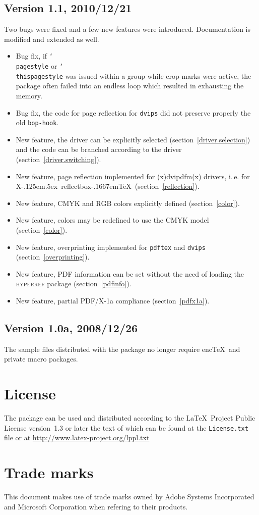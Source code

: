 \documentclass[11pt]{article}
\makeatletter
\let\pkg\textsc
\DeclareRobustCommand\cmd[1]{\texttt{\char`\\#1}}
\def\ie.{i.\,e.\@}
\DeclareRobustCommand\XeTeX{X\kern-.125em\lower.5ex\hbox{\csname
              reflectbox\endcsname{E}}\kern-.1667em\TeX}
\let\zwcomma\,
\def\,{\texorpdfstring{\zwcomma}{}}
\makeatother
\begin{document}
\subsection{Version 1.1, 2010/12/21}
Two bugs were fixed and a few new features were introduced. Documentation is modified and extended as
well.
\begin{itemize}
\item Bug fix, if \cmd{pagestyle} or \cmd{thispagestyle} was issued within a group while crop marks
were active, the package often failed into an endless loop which resulted in exhausting the memory.
\item Bug fix, the code for page reflection for \texttt{dvips} did not preserve properly the old
\texttt{bop-hook}.
\item New feature, the driver can be explicitly selected (section~\ref{driver.selection}) and the
code can be branched according to the driver (section~\ref{driver.switching}).
\item New feature, page reflection implemented for (x)dvipdfm(x) drivers, \ie. for \XeTeX\
(section~\ref{reflection}).
\item New feature, CMYK and RGB colors explicitly defined (section~\ref{color}).
\item New feature, colors may be redefined to use the CMYK model (section~\ref{color}).
\item New feature, overprinting implemented for \texttt{pdftex} and \texttt{dvips}
(section~\ref{overprinting}).
\item New feature, PDF information can be set without the need of loading the \pkg{hyperref}
package (section~\ref{pdfinfo}).
\item New feature, partial PDF/X-1a compliance (section~\ref{pdfx1a}).
\end{itemize}

\subsection{Version 1.0a, 2008/12/26}
The sample files distributed with the package no longer require enc\TeX\ and private macro
packages.

\section{License}
The package can be used and distributed according to the \LaTeX\ Project Public License version~1.3 or later the
text of which can be found at the \texttt{License.txt} file or at
\url{http://www.latex-project.org/lppl.txt}

\section{Trade marks}
This document makes use of trade marks owned by Adobe Systems Incorporated and Microsoft
Corporation when refering to their products.
\end{document}
